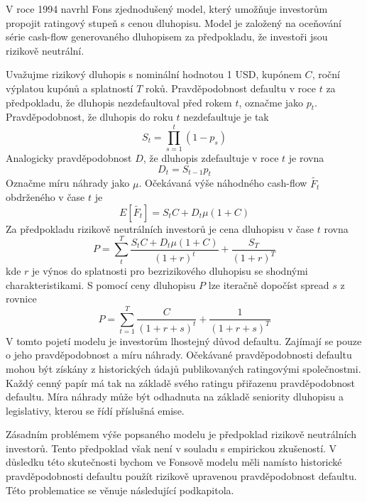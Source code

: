 \documentclass[a4paper]{book}
\begin{document}
V roce 1994 navrhl Fons zjednodušený model, který umožňuje investorům propojit ratingový stupeň s cenou dluhopisu. Model je založený na oceňování série cash-flow generovaného dluhopisem za předpokladu, že investoři jsou rizikově neutrální.

Uvažujme rizikový dluhopis s nominální hodnotou 1 USD, kupónem $C$, roční výplatou kupónů a splatností $T$ roků. Pravděpodobnost defaultu v roce $t$ za předpokladu, že dluhopis nezdefaultoval před rokem $t$, označme jako $p_t$. Pravděpodobnost, že dluhopis do roku $t$ nezdefaultuje je tak
\begin{equation*}
S_t = \prod_{s = 1}^t (1 - p_s)
\end{equation*}
Analogicky pravděpodobnost $D$, že dluhopis zdefaultuje v roce $t$ je rovna
\begin{equation*}
D_t = S_{t-1}p_t
\end{equation*}
Označme míru náhrady jako $\mu$. Očekávaná výše náhodného cash-flow $\tilde{F_t}$ obdrženého v čase $t$ je
\begin{equation*}
E[\tilde{F_t}] = S_tC + D_t \mu(1 + C)
\end{equation*}
Za předpokladu rizikově neutrálních investorů je cena dluhopisu v čase $t$ rovna
\begin{equation*}
P = \sum_t^T \frac{S_tC + D_t \mu(1 + C)}{(1 + r)^t} + \frac{S_T}{(1 + r)^T}
\end{equation*}
kde $r$ je výnos do splatnosti pro bezrizikového dluhopisu se shodnými charakteristikami. S pomocí ceny dluhopisu $P$ lze iteračně dopočíst spread $s$ z rovnice
\begin{equation}
P = \sum_{t=1}^T \frac{C}{(1 + r + s)^t} + \frac{1}{(1 + r + s)^T}
\end{equation}
V tomto pojetí modelu je investorům lhostejný důvod defaultu. Zajímají se pouze o jeho pravděpodobnost a míru náhrady. Očekávané pravděpodobnosti defaultu mohou být získány z historických údajů publikovaných ratingovými společnostmi. Každý cenný papír má tak na základě svého ratingu přiřazenu pravděpodobnost defaultu. Míra náhrady může být odhadnuta na základě seniority dluhopisu a legislativy, kterou se řídí příslušná emise.

Zásadním problémem výše popsaného modelu je předpoklad rizikově neutrálních investorů. Tento předpoklad však není v souladu s empirickou zkušeností. V důsledku této skutečnosti bychom ve Fonsově modelu měli namísto historické pravděpodobnosti defaultu použít rizikově upravenou pravděpodobnost defaultu. Této problematice se věnuje následující podkapitola.
\end{document}
